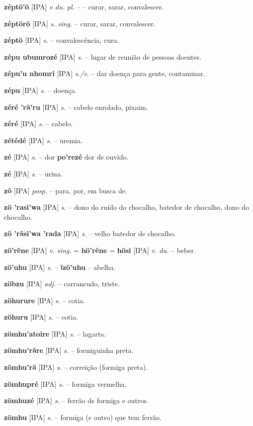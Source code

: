 \textbf{zéptö'ö} [IPA] \textit{v du. pl.} -- -- curar, sarar, convalescer.

\textbf{zéptörö} [IPA] \textit{s. sing.} -- curar, sarar, convalescer.

\textbf{zéptö} [IPA] \textit{s.} -- convalescência, cura.

\textbf{zépu ubumrozé} [IPA] \textit{s.} -- lugar de reunião de pessoas doentes.

\textbf{zépu'u nhomri} [IPA] \textit{s./v.} -- dar doença para gente, contaminar.

\textbf{zépu} [IPA] \textit{s.} -- doença.

\textbf{zéré 'rã'ru} [IPA] \textit{s.} -- cabelo enrolado, pixaim.

\textbf{zéré} [IPA] \textit{s.} -- cabelo.

\textbf{zétédé} [IPA] \textit{s.} -- uremia.

\textbf{zé} [IPA] \textit{s.} -- dor  \textbf{po'rezé} dor de ouvido.

\textbf{zé} [IPA] \textit{s.} -- urina.

\textbf{zõ} [IPA] \textit{posp.} -- para, por, em busca de.

\textbf{zö 'rasi'wa} [IPA] \textit{s.} -- dono do ruído do chocalho, batedor de chocalho, dono do chocalho.

\textbf{zö 'rãsi'wa 'rada} [IPA] \textit{s.} -- velho batedor de chocalho.

\textbf{zö'rẽne} [IPA] \textit{v. sing.} = \textbf{hö'rẽne} = \textbf{hösi} [IPA] \textit{v. du.} -- beber.

\textbf{zö'uhu} [IPA] \textit{ s.} -- \textbf{ĩzö'uhu} -- abelha.

\textbf{zöbzu} [IPA] \textit{adj.} -- carrancudo, triste.

\textbf{zöhurure} [IPA] \textit{s.} -- cotia.

\textbf{zöhuru} [IPA] \textit{s.} -- cotia.

\textbf{zömhu'atoire} [IPA] \textit{s.} -- lagarta.

\textbf{zömhu'rãre} [IPA] \textit{s.} -- formiguinha preta.

\textbf{zömhu'rã} [IPA] \textit{s.} -- correição (formiga preta).

\textbf{zömhupré} [IPA] \textit{s.} -- formiga vermelha.

\textbf{zömhuzé} [IPA] \textit{s.} -- ferrão de formiga e outros.

\textbf{zömhu} [IPA] \textit{s.} -- formiga (e outro) que tem ferrão.


